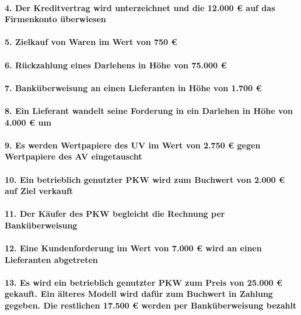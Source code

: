 \documentclass[paper=a4, fontsize=11pt]{scrartcl}
\numberwithin{equation}{section}
\numberwithin{figure}{section}
\numberwithin{table}{section}
\begin{document}
\paragraph{4. Der Kreditvertrag wird unterzeichnet und die 12.000 € auf das Firmenkonto überwiesen}

\paragraph{5. Zielkauf von Waren im Wert von 750 €}

\paragraph{6. Rückzahlung eines Darlehens in Höhe von 75.000 €}

\paragraph{7. Banküberweisung an einen Lieferanten in Höhe von 1.700 €}

\paragraph{8. Ein Lieferant wandelt seine Forderung in ein Darlehen in Höhe von 4.000 € um}

\paragraph{9. Es werden Wertpapiere des UV im Wert von 2.750 € gegen Wertpapiere des AV eingetauscht}

\paragraph{10. Ein betrieblich genutzter PKW wird zum Buchwert von 2.000 € auf Ziel verkauft}

\paragraph{11. Der Käufer des PKW begleicht die Rechnung per Banküberweisung}

\paragraph{12. Eine Kundenforderung im Wert von 7.000 € wird an einen Lieferanten abgetreten}

\paragraph{13. Es wird ein betrieblich genutzter PKW zum Preis von 25.000 € gekauft. Ein älteres Modell wird dafür zum Buchwert in Zahlung gegeben. Die restlichen 17.500 € werden per Banküberweisung bezahlt}
\end{document}
